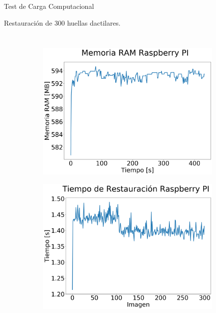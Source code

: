 \documentclass[12pt,aspectratio=169]{beamer}
\begin{document}
\begin{frame}{Test de Carga Computacional}

    Restauración de 300 huellas dactilares.

    \begin{columns}[c] 
            \begin{figure}
            \begin{subfigure}{0.45\textwidth}
                \centering
                \includegraphics[scale=0.11]{figs/RAM RB.png}
            \end{subfigure}
            \begin{subfigure}{0.45\textwidth}
                \centering
                \includegraphics[scale=0.11]{figs/Tiempo RB.png}

\end{subfigure}
\end{figure}
\end{columns}
\end{frame}
\end{document}
